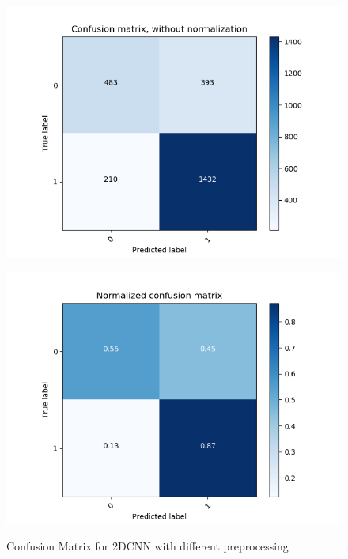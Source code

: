 \begin{figure}[H]
\begin{minipage}[b]{0.45\columnwidth}
	\includegraphics[clip, width=\linewidth]{fig/chapter4/count_pretrain_True_he_True}
	\label{fig:count_pretrain_preprocess}
    \end{minipage}
	\begin{minipage}[b]{0.45\columnwidth}
		\centering
		\includegraphics[clip, width=\linewidth]{fig/chapter4/pretrain_True_he_True}
		\label{fig:pretrain_preprocess}
	\end{minipage}
	
	\caption{Confusion Matrix for 2DCNN with different preprocessing}
	\label{fig:2d_preprocess_matrix}
	
\end{figure}

